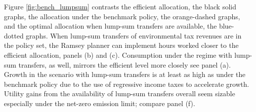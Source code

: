  Figure \ref{fig:bench_lumpsum} contrasts the efficient allocation, the black solid graphs, the allocation under the benchmark policy, the orange-dashed graphs, and the optimal allocation when lump-sum transfers are available, the blue-dotted graphs. 
When lump-sum transfers of environmental tax revenues are in the policy set, the Ramsey planner can implement hours worked closer to the efficient allocation, panels (b) and (c). Consumption under the regime with lump-sum transfers, as well, mirrors the efficient level more closely see panel (a). 
Growth in the scenario with lump-sum transfers is at least as high as under the benchmark policy due to the use of regressive income taxes to accelerate growth. %
Utility gains from the availability of lump-sum transfers overall seem sizable especially under the net-zero emission limit; compare panel (f).

